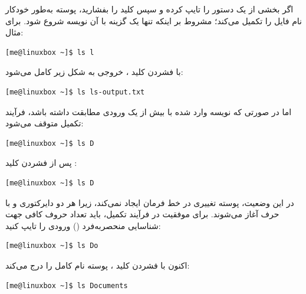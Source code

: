 اگر بخشی از یک دستور را تایپ کرده و سپس کلید  را بفشارید، پوسته به‌طور خودکار نام فایل را تکمیل می‌کند؛ مشروط بر اینکه تنها یک گزینه با آن نویسه شروع شود. برای مثال:

\begin{latin}
\begin{lstlisting}
[me@linuxbox ~]$ ls l
\end{lstlisting}
\end{latin}

با فشردن کلید ، خروجی به شکل زیر کامل می‌شود:

\begin{latin}
\begin{lstlisting}
[me@linuxbox ~]$ ls ls-output.txt
\end{lstlisting}
\end{latin}

اما در صورتی که نویسه وارد شده با بیش از یک ورودی مطابقت داشته باشد، فرآیند تکمیل متوقف می‌شود:

\begin{latin}
\begin{lstlisting}
[me@linuxbox ~]$ ls D
\end{lstlisting}
\end{latin}

پس از فشردن کلید :

\begin{latin}
\begin{lstlisting}
[me@linuxbox ~]$ ls D
\end{lstlisting}
\end{latin}

در این وضعیت، پوسته تغییری در خط فرمان ایجاد نمی‌کند، زیرا هر دو دایرکتوری  و  با حرف  آغاز می‌شوند. برای موفقیت در فرآیند تکمیل، باید تعداد حروف کافی جهت شناسایی منحصربه‌فرد () ورودی را تایپ کنید:

\begin{latin}
\begin{lstlisting}
[me@linuxbox ~]$ ls Do
\end{lstlisting}
\end{latin}

اکنون با فشردن کلید ، پوسته نام کامل را درج می‌کند:

\begin{latin}
\begin{lstlisting}
[me@linuxbox ~]$ ls Documents
\end{lstlisting}
\end{latin}

